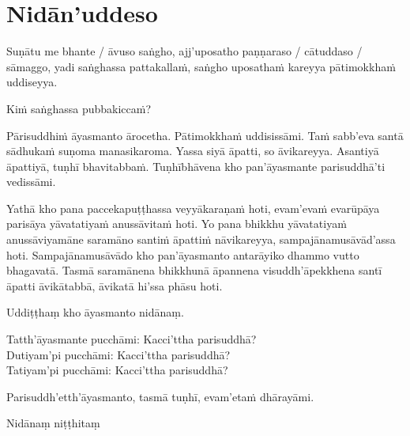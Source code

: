 \section{Nidān'uddeso}
\label{nidan'uddeso}

Suṇātu me bhante / āvuso saṅgho, ajj'uposatho paṇṇaraso / cātuddaso / sāmaggo, yadi saṅghassa pattakallaṁ, saṅgho uposathaṁ kareyya pātimokkhaṁ uddiseyya.

Kiṁ saṅghassa pubbakiccaṁ?

Pārisuddhiṁ āyasmanto ārocetha. Pātimokkhaṁ uddisissāmi. Taṁ sabb'eva santā sādhukaṁ suṇoma manasikaroma. Yassa siyā āpatti, so āvikareyya. Asantiyā āpattiyā, tuṇhī bhavitabbaṁ. Tuṇhībhāvena kho pan'āyasmante parisuddhā'ti vedissāmi.

Yathā kho pana paccekapuṭṭhassa veyyākaraṇaṁ hoti, evam'evaṁ evarūpāya parisāya yāvatatiyaṁ anussāvitaṁ hoti. Yo pana bhikkhu yāvatatiyaṁ anussāviyamāne saramāno santiṁ āpattiṁ nāvikareyya, sampajānamusāvād'assa hoti. Sampajānamusāvādo kho pan'āyasmanto antarāyiko dhammo vutto bhagavatā. Tasmā saramānena bhikkhunā āpannena visuddh'āpekkhena santī āpatti āvikātabbā, āvikatā hi'ssa phāsu hoti.

\medskip

\begin{center}
Uddiṭṭhaṃ kho āyasmanto nidānaṃ.\makeatletter\hyperlink{endnote8-appendix}\makeatother

\smallskip

Tatth'āyasmante pucchāmi: Kacci'ttha parisuddhā?\\
Dutiyam'pi pucchāmi: Kacci'ttha parisuddhā?\\
Tatiyam'pi pucchāmi: Kacci'ttha parisuddhā?

\smallskip

Parisuddh'etth'āyasmanto, tasmā tuṇhī, evam'etaṁ dhārayāmi.
\end{center}

\begin{outro}
  Nidānaṃ niṭṭhitaṃ\makeatletter\hyperlink{endnote9-appendix}\makeatother
\end{outro}

\clearpage
